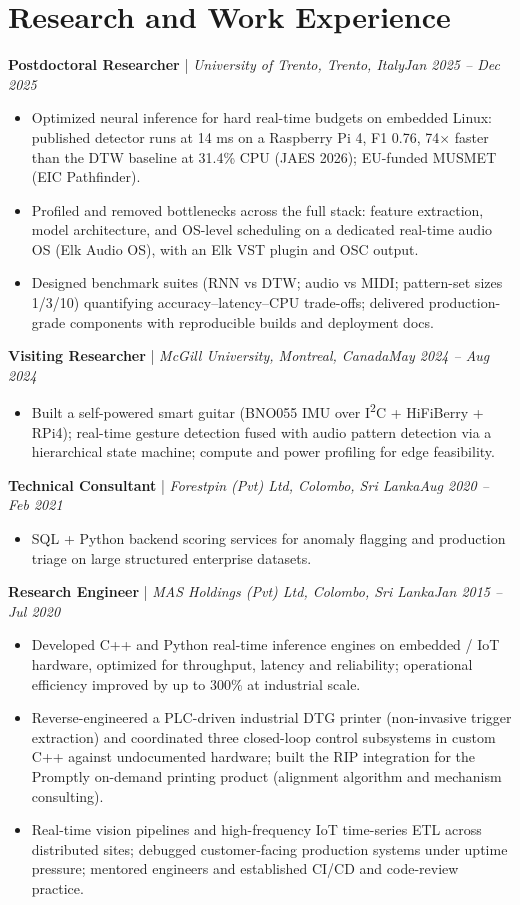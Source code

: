 \documentclass[11pt]{article}
\newenvironment{cvrole}[5]{%
  \par\noindent\textbf{\large #1} | \textit{\small #2, #3}\hfill \textit{\small #4 -- #5}\par
  \begin{itemize}[leftmargin=2em, itemsep=-0.3em, topsep=-0.5em]%
}{%
  \end{itemize}\par\noindent\mbox{}\par\vspace{0.1em}%
}
\begin{document}
\section*{Research and Work Experience}

\begin{cvrole}{Postdoctoral Researcher}{University of Trento}{Trento, Italy}{Jan 2025}{Dec 2025}
    \item Optimized neural inference for hard real-time budgets on embedded Linux: published detector runs at 14 ms on a Raspberry Pi 4, F1 0.76, 74$\times$ faster than the DTW baseline at 31.4\% CPU (JAES 2026); EU-funded MUSMET (EIC Pathfinder).
    \item Profiled and removed bottlenecks across the full stack: feature extraction, model architecture, and OS-level scheduling on a dedicated real-time audio OS (Elk Audio OS), with an Elk VST plugin and OSC output.
    \item Designed benchmark suites (RNN vs DTW; audio vs MIDI; pattern-set sizes 1/3/10) quantifying accuracy--latency--CPU trade-offs; delivered production-grade components with reproducible builds and deployment docs.
\end{cvrole}

\begin{cvrole}{Visiting Researcher}{McGill University}{Montreal, Canada}{May 2024}{Aug 2024}
    \item Built a self-powered smart guitar (BNO055 IMU over I\textsuperscript{2}C + HiFiBerry + RPi4); real-time gesture detection fused with audio pattern detection via a hierarchical state machine; compute and power profiling for edge feasibility.
\end{cvrole}

\begin{cvrole}{Technical Consultant}{Forestpin (Pvt) Ltd}{Colombo, Sri Lanka}{Aug 2020}{Feb 2021}
    \item SQL + Python backend scoring services for anomaly flagging and production triage on large structured enterprise datasets.
\end{cvrole}

\begin{cvrole}{Research Engineer}{MAS Holdings (Pvt) Ltd}{Colombo, Sri Lanka}{Jan 2015}{Jul 2020}
    \item Developed C++ and Python real-time inference engines on embedded / IoT hardware, optimized for throughput, latency and reliability; operational efficiency improved by up to 300\% at industrial scale.
    \item Reverse-engineered a PLC-driven industrial DTG printer (non-invasive trigger extraction) and coordinated three closed-loop control subsystems in custom C++ against undocumented hardware; built the RIP integration for the Promptly on-demand printing product (alignment algorithm and mechanism consulting).
    \item Real-time vision pipelines and high-frequency IoT time-series ETL across distributed sites; debugged customer-facing production systems under uptime pressure; mentored engineers and established CI/CD and code-review practice.
\end{cvrole}
\end{document}
